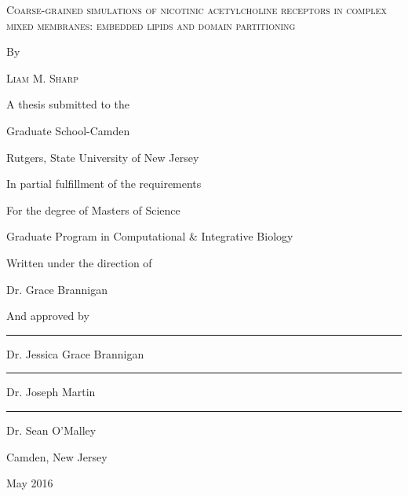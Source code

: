 \documentclass[10pt, letterpaper]{article}
\begin{document}
\renewcommand{\thepage}{\roman{page}}
\begin{titlepage}
	\centering
	{\scshape\large Coarse-grained simulations of nicotinic acetylcholine receptors in complex mixed membranes: embedded lipids and domain partitioning\par}
	 By \par
	{\scshape\large Liam M. Sharp \par}
	 A thesis submitted to the \par
	 Graduate School-Camden \par
	 Rutgers, State University of New Jersey \par

	 In partial fulfillment of the requirements\par

	 For the degree of Masters of Science\par

	 Graduate Program in Computational \& Integrative Biology\par

	 Written under the direction of\par

	 Dr. Grace Brannigan\par

	 And approved by\par
	
	\noindent\rule{8cm}{0.4pt}\par
	Dr. Jessica Grace Brannigan\par
	
	\noindent\rule{8cm}{0.4pt}\par
	Dr. Joseph Martin\par
	
	\noindent\rule{8cm}{0.4pt}\par
	Dr. Sean O'Malley\par
	
	


	\vfill
	Camden, New Jersey\par
	May 2016\par
\end{titlepage}
\end{document}
